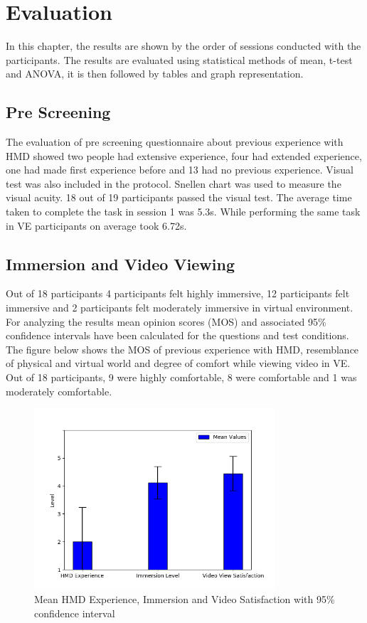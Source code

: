 \chapter{Evaluation}
\label{sec:Evaluation}
In this chapter, the results are shown by the order of sessions conducted with the participants. The results are evaluated using statistical methods of mean, t-test and ANOVA, it is then followed by tables and graph representation. 
\section{Pre Screening}
The evaluation of pre screening questionnaire about previous experience with HMD showed two people had extensive experience, four had extended experience, one had made first experience before and 13 had no previous experience. Visual test was also included in the protocol. Snellen chart was used to measure the visual acuity. 18 out of 19 participants passed the visual test. The average time taken to complete the task in session 1 was 5.3s. While performing the same task in VE participants on average took 6.72s.

\section{Immersion and Video Viewing}
Out of 18 participants 4 participants felt highly immersive, 12 participants felt immersive and 2 participants felt moderately immersive in virtual environment.
For analyzing the results mean opinion scores (MOS) and associated 95\% confidence intervals have been calculated for the questions and test conditions. The figure below shows the MOS of previous experience with HMD, resemblance of physical and virtual world and degree of comfort while viewing video in VE. Out of 18 participants, 9 were highly comfortable, 8 were comfortable and 1 was moderately comfortable.\par 
\begin{figure}[h]
    \centering
    \includegraphics[width=0.8\textwidth]{./images/immersion1.png}
    \caption{Mean HMD Experience, Immersion and Video Satisfaction with 95\% confidence interval}
    \label{fig:immersion1}
\end{figure}
